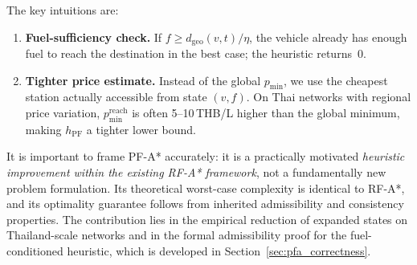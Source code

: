 The key intuitions are:
\begin{enumerate}
    \item \textbf{Fuel-sufficiency check.}
          If $f \geq d_{\mathrm{geo}}(v,t)/\eta$, the vehicle already has enough fuel to reach
          the destination in the best case; the heuristic returns~0.
    \item \textbf{Tighter price estimate.}
          Instead of the global $p_{\min}$, we use the cheapest station actually accessible from
          state $(v, f)$. On Thai networks with regional price variation,
          $p_{\min}^{\mathrm{reach}}$ is often 5--10\,THB/L higher than the global minimum,
          making $h_{\mathrm{PF}}$ a tighter lower bound.
\end{enumerate}

It is important to frame PF-A* accurately: it is a practically motivated \emph{heuristic
improvement within the existing RF-A* framework}, not a fundamentally new problem
formulation.
Its theoretical worst-case complexity is identical to RF-A*, and its optimality guarantee
follows from inherited admissibility and consistency properties.
The contribution lies in the empirical reduction of expanded states on Thailand-scale networks
and in the formal admissibility proof for the fuel-conditioned heuristic, which is developed in
Section~\ref{sec:pfa_correctness}.
